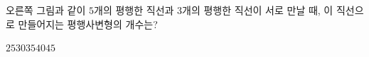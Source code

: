 \hspace*{2mm}\begin{minipage}[t]{\dimexpr\linewidth-2mm\relax}\vspace{0pt}
\noindent\begin{minipage}[t]{0.58\linewidth}\vspace{0pt}\raggedright 오른쪽 그림과 같이 $5$개의 평행한 직선과 $3$개의 평행한 직선이 서로 만날 때, 이 직선으로 만들어지는 평행사변형의 개수는?\end{minipage}\hfill\begin{minipage}[t]{0.4\linewidth}\vspace{0pt}\centering \resizebox{\ifdim\width>\linewidth\linewidth\else\width\fi}{!}{}\end{minipage}\par
\begin{choices32}{$25$}{$30$}{$35$}{$40$}{$45$}\end{choices32}\end{minipage}
